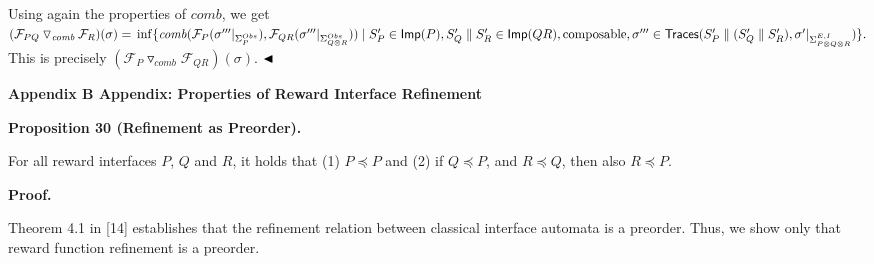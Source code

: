  
 
Using again the properties of $\mathit{comb}$, we get $({{\mathcal{F}_{PQ}}\mathbin{\triangledown_{\mathit{comb}}}{\mathcal{F}_{R}}})(\sigma)=\\
\inf\{\mathit{comb}(\mathcal{F}_{P}(\sigma^{\prime\prime\prime}|_{\Sigma_{P}^{Obs}}),\mathcal{F}_{QR}(\sigma^{\prime\prime\prime}|_{\Sigma_{Q\otimes R}^{Obs}}))\mid S^{\prime}_{P}\in\mathsf{Imp}(P),S^{\prime}_{Q}\parallel S^{\prime}_{R}\in\mathsf{Imp}(QR),\text{composable},\\
\sigma^{\prime\prime\prime}\in\mathsf{Traces}(S^{\prime}_{P}\parallel(S^{\prime}_{Q}\parallel S^{\prime}_{R}),\sigma^{\prime}|_{\Sigma_{P\otimes Q\otimes R}^{E,I}})\}.$ This is precisely $({{\mathcal{F}_{P}}\mathbin{\triangledown_{\mathit{comb}}}{\mathcal{F}_{QR}}})(\sigma)$. $\hfill\blacktriangleleft$\par
 
 
 


 
\par\medskip\noindent\textbf{Appendix B Appendix: Properties of Reward Interface Refinement}\par
 
 
\par\medskip\noindent\textbf{Proposition 30 (Refinement as Preorder).}\par
 
 
For all reward interfaces $P$, $Q$ and $R$, it holds that (1) $P\preceq P$ and (2) if $Q\preceq P$, and $R\preceq Q$, then also $R\preceq P$.\par
 
 
 
 
\par\medskip\noindent\textbf{Proof.}\par
 
 
Theorem 4.1 in [14] establishes that the refinement relation between classical interface automata is a preorder. Thus, we show only that reward function refinement is a preorder.\par
 
